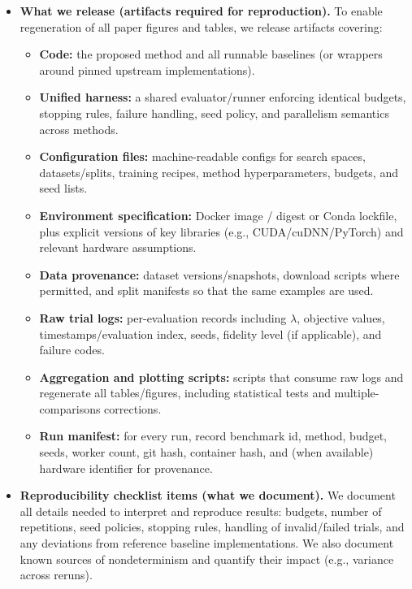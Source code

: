 \begin{itemize}
    \item \textbf{What we release (artifacts required for reproduction).}
    To enable regeneration of all paper figures and tables, we release artifacts covering:
    \begin{itemize}
        \item \textbf{Code:} the proposed method and all runnable baselines (or wrappers around pinned upstream implementations).
        \item \textbf{Unified harness:} a shared evaluator/runner enforcing identical budgets, stopping rules, failure handling,
        seed policy, and parallelism semantics across methods.
        \item \textbf{Configuration files:} machine-readable configs for search spaces, datasets/splits, training recipes,
        method hyperparameters, budgets, and seed lists.
        \item \textbf{Environment specification:} Docker image / digest or Conda lockfile, plus explicit versions of key libraries
        (e.g., CUDA/cuDNN/PyTorch) and relevant hardware assumptions.
        \item \textbf{Data provenance:} dataset versions/snapshots, download scripts where permitted, and split manifests
        so that the same examples are used.
        \item \textbf{Raw trial logs:} per-evaluation records including \(\lambda\), objective values, timestamps/evaluation index,
        seeds, fidelity level (if applicable), and failure codes.
        \item \textbf{Aggregation and plotting scripts:} scripts that consume raw logs and regenerate all tables/figures,
        including statistical tests and multiple-comparisons corrections.
        \item \textbf{Run manifest:} for every run, record benchmark id, method, budget, seeds, worker count, git hash, container hash,
        and (when available) hardware identifier for provenance.
    \end{itemize}

    \item \textbf{Reproducibility checklist items (what we document).}
    We document all details needed to interpret and reproduce results:
    budgets, number of repetitions, seed policies, stopping rules,
    handling of invalid/failed trials, and any deviations from reference baseline implementations.
    We also document known sources of nondeterminism and quantify their impact (e.g., variance across reruns).


\end{itemize}
